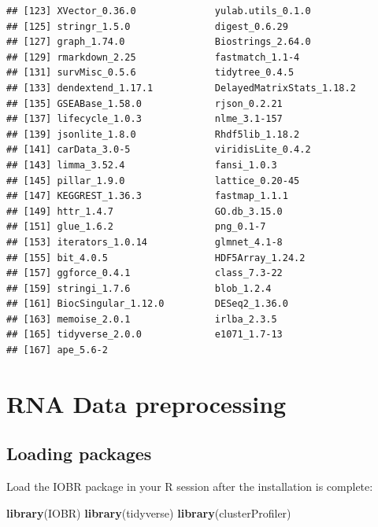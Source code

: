 \documentclass[
  12pt,
]{book}
\newenvironment{Shaded}{\begin{snugshade}}{\end{snugshade}}
\newcommand{\FunctionTok}[1]{\textcolor[rgb]{0.13,0.29,0.53}{\textbf{#1}}}
\newcommand{\NormalTok}[1]{#1}
\begin{document}
\begin{verbatim}
## [123] XVector_0.36.0              yulab.utils_0.1.0          
## [125] stringr_1.5.0               digest_0.6.29              
## [127] graph_1.74.0                Biostrings_2.64.0          
## [129] rmarkdown_2.25              fastmatch_1.1-4            
## [131] survMisc_0.5.6              tidytree_0.4.5             
## [133] dendextend_1.17.1           DelayedMatrixStats_1.18.2  
## [135] GSEABase_1.58.0             rjson_0.2.21               
## [137] lifecycle_1.0.3             nlme_3.1-157               
## [139] jsonlite_1.8.0              Rhdf5lib_1.18.2            
## [141] carData_3.0-5               viridisLite_0.4.2          
## [143] limma_3.52.4                fansi_1.0.3                
## [145] pillar_1.9.0                lattice_0.20-45            
## [147] KEGGREST_1.36.3             fastmap_1.1.1              
## [149] httr_1.4.7                  GO.db_3.15.0               
## [151] glue_1.6.2                  png_0.1-7                  
## [153] iterators_1.0.14            glmnet_4.1-8               
## [155] bit_4.0.5                   HDF5Array_1.24.2           
## [157] ggforce_0.4.1               class_7.3-22               
## [159] stringi_1.7.6               blob_1.2.4                 
## [161] BiocSingular_1.12.0         DESeq2_1.36.0              
## [163] memoise_2.0.1               irlba_2.3.5                
## [165] tidyverse_2.0.0             e1071_1.7-13               
## [167] ape_5.6-2
\end{verbatim}

\hypertarget{rna-data-preprocessing}{%
\chapter{\texorpdfstring{\textbf{RNA Data preprocessing}}{RNA Data preprocessing}}\label{rna-data-preprocessing}}

\hypertarget{loading-packages}{%
\section{Loading packages}\label{loading-packages}}

Load the IOBR package in your R session after the installation is complete:

\begin{Shaded}
\begin{Highlighting}[]
\FunctionTok{library}\NormalTok{(IOBR)}
\FunctionTok{library}\NormalTok{(tidyverse)}
\FunctionTok{library}\NormalTok{(clusterProfiler)}
\end{Highlighting}
\end{Shaded}
\end{document}
